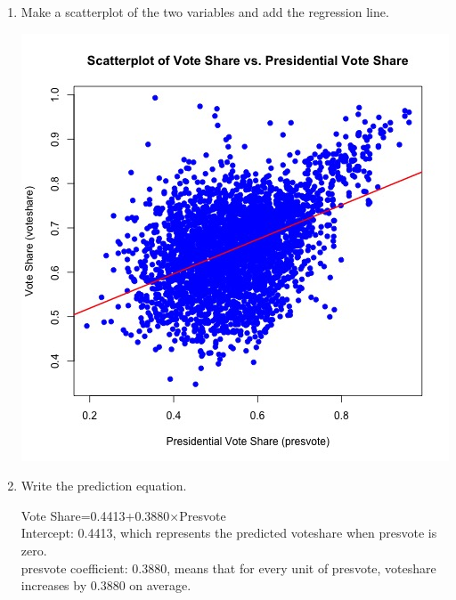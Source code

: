 \documentclass[12pt,letterpaper]{article}
\begin{document}
\begin{enumerate}
			
		\item Make a scatterplot of the two variables and add the regression line. 
		  
			\includegraphics[width=.85\textwidth]{scatterplot_voteshare_presvote3.jpg}
	
			
		\item Write the prediction equation.
	
		Vote Share=0.4413+0.3880×Presvote\\
		
		Intercept: 0.4413, which represents the predicted voteshare when presvote is zero.\\
		presvote coefficient: 0.3880, means that for every unit of presvote, voteshare increases by 0.3880 on average.\\
		
	\end{enumerate}
	

\newpage	
\end{document}
